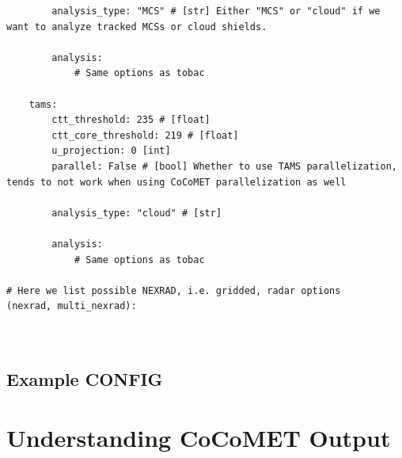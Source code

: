 \documentclass[10pt,a4paper]{article}
\begin{document}
\begin{lstlisting}
		analysis_type: "MCS" # [str] Either "MCS" or "cloud" if we want to analyze tracked MCSs or cloud shields.
		
		analysis:
			# Same options as tobac
		
	tams:
		ctt_threshold: 235 # [float]
		ctt_core_threshold: 219 # [float]
		u_projection: 0 [int]
		parallel: False # [bool] Whether to use TAMS parallelization, tends to not work when using CoCoMET parallelization as well
		
		analysis_type: "cloud" # [str] 
		
		analysis:
			# Same options as tobac
			
# Here we list possible NEXRAD, i.e. gridded, radar options
(nexrad, multi_nexrad):
	
			
		\end{lstlisting}
	
	\subsection{Example CONFIG}
	
	\section{Understanding CoCoMET Output} \label{sec:out}
	
\end{document}
